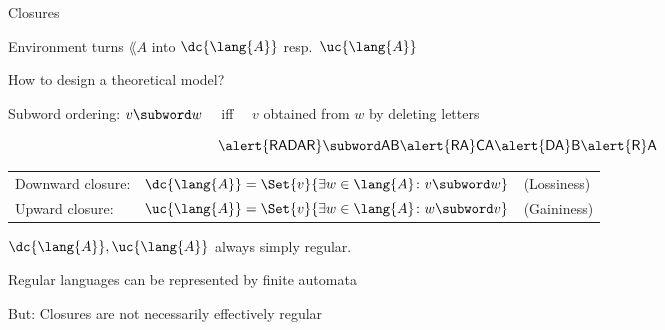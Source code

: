 \documentclass[../talk.tex]{subfiles}
\begin{document}
\begin{frame}{Closures}
    \begin{overlayarea}{\slidewidth}{\slideheight}
        Environment turns $\lang{A}$ into $\dc{\lang{A}}$ resp.~$\uc{\lang{A}}$

        \vspace*{1em}

        How to design a theoretical model?

        \vspace*{1em}


        {%
            \alert{Subword ordering:} $v \subword w$ \ \ iff \ \ $v$ obtained from $w$ by deleting letters
        }

        {%
            \vspace*{-0.2em}
            \[
                \mathsf{\alert{RADAR}}
                \subword
                \mathsf{AB\alert{RA}CA\alert{DA}B\alert{R}A}
            \]
        }

        {%
            \vspace*{0.2em}
            \begin{tabular}{lll}
                \alert{Downward closure:}
                &
                $\dc{\lang{A}} = \Set{ v }{ \exists w \in \lang{A} \colon v \subword w}$
                &
                (Lossiness)
                \\
                \noindent\alert{Upward closure:} &
                $\uc{\lang{A}} = \Set{ v }{ \exists w \in \lang{A} \colon w \subword v}$
                &
                (Gaininess)
            \end{tabular}
            \vspace*{0.2em}
        }

        {%
            \vspace*{-0.85mm}
            \begin{theorem}
                $\dc{\lang{A}}, \uc{\lang{A}}$ always simply \alert{regular}.
            \end{theorem}
        }

        {%
            Regular languages can be represented by \alert{finite automata}
        }

        {%
            \vspace*{1em}

            But: Closures are \alert{not necessarily effectively regular}
        }
    \end{overlayarea}
\end{frame}
\end{document}
